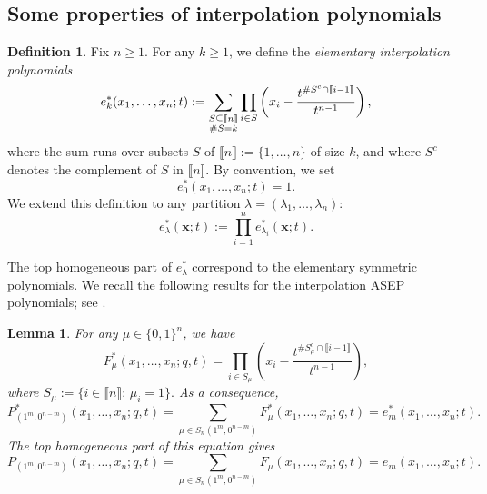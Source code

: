\documentclass[12pt]{amsart}
\newtheorem{lem}[thm]{Lemma}
\theoremstyle{definition}
\newtheorem{definition}[thm]{Definition}
\newcommand{\bfx}{\boldsymbol{x}}
\begin{document}
\subsection{Some properties of interpolation polynomials}
\begin{definition}\label{def:int_elem}
Fix $n\geq 1$. For any $k\geq 1$, we define the \emph{elementary interpolation polynomials}
$$e^*_{k}(x_1,\dots,x_n;t):=\sum_{\begin{subarray}{c}S\subseteq \llbracket n \rrbracket\\  \#S=k\end{subarray}}\prod_{i\in S}\left(x_i-\frac{t^{\#S^c\cap \llbracket i-1\rrbracket}}{t^{n-1}}\right),$$
where the sum runs over subsets $S$ of $\llbracket n\rrbracket:=\{1,\dots, n\}$ of size $k$, and where $S^c$ denotes the complement of $S$ in $\llbracket n\rrbracket$. By convention, we set
$$e_0^*(x_1,\dots,x_n;t)=1.$$
We extend this definition to any partition $\lambda=(\lambda_1,\dots,\lambda_n)$:
$$e_\lambda^*(\bfx;t):=\prod_{i=1}^n e^*_{\lambda_i}(\bfx;t).$$
\end{definition}
The top homogeneous part of $e_{\lambda}^*$ correspond to the elementary symmetric polynomials.
We recall the following results for the interpolation ASEP polynomials; see \cite[Lemma 7.2]{BenDaliWilliams2025}.
\begin{lem}\label{lem:P_column}
        For any $\mu\in\{0,1\}^n$, we have
        \begin{equation}\label{eq:factorization_one_row}
          F_\mu^*(x_1,\dots,x_n;q,t)=\prod_{i\in S_\mu}\left(x_i-\frac{t^{\#S^c_\mu\cap \llbracket i-1\rrbracket}}{t^{n-1}}\right), \end{equation}
          where $S_\mu:=\{i\in \llbracket n\rrbracket: \, \mu_i=1\}.$
        As a consequence, 
    \begin{equation}\label{eq:P_column}
          P^*_{(1^m,0^{n-m})}(x_1,\dots,x_n;q,t)=\sum_{\mu\in S_n(1^m,0^{n-m})}F^*_{\mu}(x_1,\dots,x_n;q,t)=e^*_m(x_1,\dots,x_n;t).  
        \end{equation}
        The top homogeneous part of this equation gives
    \begin{equation}\label{eq:P_column_hom}
          P_{(1^m,0^{n-m})}(x_1,\dots,x_n;q,t)=\sum_{\mu\in S_n(1^m,0^{n-m})}F_{\mu}(x_1,\dots,x_n;q,t)=e_m(x_1,\dots,x_n;t).  
        \end{equation}
\end{lem}



\fi
\end{document}
